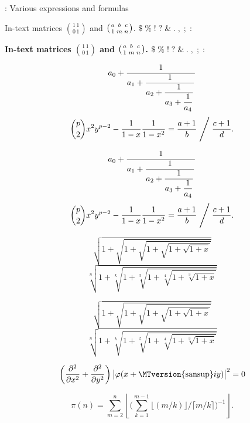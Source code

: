 \documentclass[aspectratio = 169, t, 10pt]{beamer}
\renewcommand{\mathrm}[1]{\textrm{\MTversion{sansup}\(#1\)}}%
\begin{document}
\begin{frame}[allowframebreaks]{\insertsection: Various expressions and formulas}
\endgroup

\framebreak

\noindent In-text matrices $\binom{1\,1}{0\,1}$ and $\bigl(\genfrac{}{}{0pt}{}{a}{1}\genfrac{}{}{0pt}{}{b}{m}\genfrac{}{}{0pt}{}{c}{n}\bigr)$.
$\$ \; \% \; ! \; ? \; \& \; . \; , \; ; \; :$

\begingroup

\bfseries\boldmath
\noindent In-text matrices $\binom{1\,1}{0\,1}$ and $\bigl(\genfrac{}{}{0pt}{}{a}{1}\genfrac{}{}{0pt}{}{b}{m}\genfrac{}{}{0pt}{}{c}{n}\bigr)$.
$\$ \; \% \; ! \; ? \; \& \; . \; , \; ; \; :$

\endgroup

\framebreak

$$a_0+\frac1{\displaystyle a_1 +
	{\strut \frac1{\displaystyle a_2 +
			{\strut \frac1{\displaystyle a_3 +
					{\strut \frac1{\displaystyle a_4}}}}}}}$$
$$\binom{p}{2}x^2y^{p-2} - \frac1{1 - x}\frac{1}{1 - x^2}
=
\frac{a+1}{b}\Biggm/\frac{c+1}{d}.$$

\framebreak

\begingroup
\boldmath

$$a_0+\frac1{\displaystyle a_1 +
	{\strut \frac1{\displaystyle a_2 +
			{\strut \frac1{\displaystyle a_3 +
					{\strut \frac1{\displaystyle a_4}}}}}}}$$
$$\binom{p}{2}x^2y^{p-2} - \frac1{1 - x}\frac{1}{1 - x^2}
=
\frac{a+1}{b}\Biggm/\frac{c+1}{d}.$$

\endgroup

\framebreak

$$\sqrt{1+\sqrt{1+\sqrt{1+\sqrt{1+\sqrt{1+x}}}}}$$
$$\sqrt[n]{1+\sqrt[k]{1+\sqrt[5]{1+\sqrt[4]{1+\sqrt[3]{1+x}}}}}$$

\framebreak

\begingroup
\boldmath

$$\sqrt{1+\sqrt{1+\sqrt{1+\sqrt{1+\sqrt{1+x}}}}}$$
$$\sqrt[n]{1+\sqrt[k]{1+\sqrt[5]{1+\sqrt[4]{1+\sqrt[3]{1+x}}}}}$$

\endgroup

\framebreak

$$\left(\frac{\partial^2}{\partial x^2} + \frac{\partial^2}{\partial y^2}\right)
\bigl|\varphi(x+\mathrm{i}y)\bigr|^2=0$$



$$\pi(n)=\sum_{m=2}^n\left\lfloor\Biggl(\sum_{k=1}^{m-1}\bigl
\lfloor(m/k)\bigr\rfloor \Big/ \lceil m/k\rceil\Biggr)^{-1}\right\rfloor.$$


\end{frame}
\end{document}
